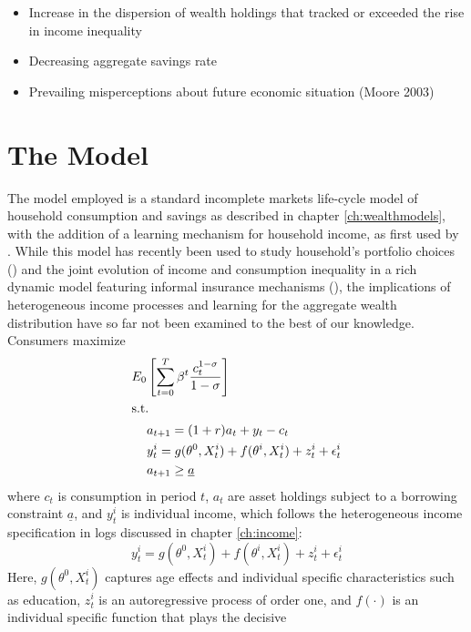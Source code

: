 \begin{itemize}
\item Increase in the dispersion of wealth holdings that tracked or exceeded the 
rise in income inequality
\item Decreasing aggregate savings rate
\item Prevailing misperceptions about future economic situation (Moore 2003)
\end{itemize}

\pagebreak
\section{The Model}\label{sec:model}
The model employed is a standard incomplete markets life-cycle model of household  
consumption and savings as described in chapter \ref{ch:wealthmodels}, with the
addition of a learning mechanism for household income, as first used by 
\citet{Guvenen2007}. While this model has recently been used to study household's
portfolio choices (\citealt{ChangHongKarabarbounis2015}) and the joint evolution 
of income and consumption inequality in a rich dynamic model featuring informal
insurance mechanisms (\citealt{GuvenenSmith2014}), the implications of heterogeneous
income processes and learning for the aggregate wealth distribution have so far
not been examined to the best of our knowledge.
Consumers maximize
\begin{align}
E_0 &\left[ \sum_{t=0}^{T} \beta^{t} \frac{c_{t}^{1-\sigma}}{1-\sigma} \right] \label{eq:maxprob} \\
\intertext{s.t. } &a_{t+1} = (1+r)a_t + y_t - c_t \label{eq:bc} \\
				  &y_{t}^i = g(\theta^0, X_t^i) + f(\theta^i, X_t^i) + z_t^i + \epsilon_t^i \label{eq:incproc} \\
  				  &a_{t+1} \geq \underline{a} \label{eq:borrcons} 
\end{align}
where $c_t$ is consumption in period $t$, $a_t$ are asset holdings subject to 
a borrowing constraint  $\underline{a}$, and $y_t^i$ is individual 
income, which follows the heterogeneous income specification in logs discussed
in chapter \ref{ch:income}: 
\begin{equation*}
y_{t}^i = g(\theta^0, X_t^i) + f(\theta^i, X_t^i) + z_t^i + \epsilon_t^i 
\end{equation*}
Here, $g(\theta^0, X_t^i)$ captures age effects and individual specific 
characteristics such as education, $z_t^i$ is an autoregressive process of order
 one, and $f(\cdot)$ is an individual specific function that plays the decisive
